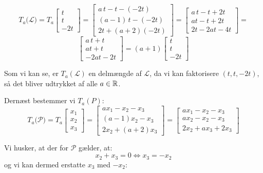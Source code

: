 \documentclass[a4paper,12pt]{article}
\begin{document}
\[
T_a\bigl(\mathcal{L})
=
T_a 
\left[\begin{array}{c}
    t\\
    t\\
    -2t
\end{array}\right]
=
\left[\begin{array}{ccc}
    a\,t  -t  -(-2t)\\[6pt]
    (a-1)\,t  -(-2t)\\[6pt]
     2t + (a+2)(-2t)
\end{array}\right]
=
\left[\begin{array}{ccc}
    a\,t  - t + 2t\\[6pt]
    at-t + 2t\\[6pt]
     2t - 2at -4t
\end{array}\right]
=
\]
\[
\left[\begin{array}{ccc}
    a\,t  +t \\
    at + t \\
    -2at-2t
\end{array}\right]
=
(a+1)
\left[\begin{array}{ccc}
    t \\
    t \\
    -2t
\end{array}\right]
\]

Som vi kan se, er $T_a(\mathcal{L})$ en delmængde af $\mathcal{L}$, da vi kan faktorisere $(t, t, -2t)$, så det bliver udtrykket af alle $a \in \mathbb{R}$.\\



\bigskip
 
Dernæst bestemmer vi $T_a(P)$:\\
\[
T_a\bigl(\mathcal{P})
=
T_a 
\left[\begin{array}{c}
    x_1\\
    x_2\\
    x_3
\end{array}\right]
=
\left[\begin{array}{ccc}
    ax_1  -x_2  -x_3\\
    (a-1)x_2  -x_3\\
     2x_2 + (a+2)x_3
\end{array}\right]
=
\left[\begin{array}{ccc}
    ax_1  -x_2  -x_3\\
    ax_2 - x_2  -x_3\\
     2x_2 + ax_3 + 2x_3
\end{array}\right]
\]

Vi husker, at der for $\mathcal{P}$ gælder, at:
\[
x_2+x_3 = 0 \Leftrightarrow x_3 = -x_2
\]
og vi kan dermed erstatte $x_3$ med $-x_2$:
\end{document}
